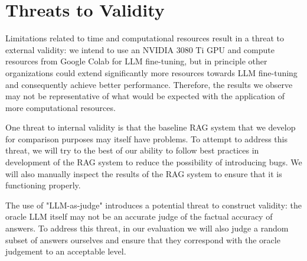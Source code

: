 \section{Threats to Validity}

Limitations related to time and computational resources result in a threat to
external validity: we intend to use an NVIDIA 3080 Ti GPU and compute resources
from Google Colab for LLM fine-tuning, but in principle other organizations
could extend significantly more resources towards LLM fine-tuning and
consequently achieve better performance. Therefore, the results we observe may
not be representative of what would be expected with the application of more
computational resources.

One threat to internal validity is that the baseline
RAG system that we develop for comparison purposes may itself have problems. To
attempt to address this threat, we will try to the best of our ability to follow
best practices in development of the RAG system to reduce the possibility of
introducing bugs. We will also manually inspect the results of the RAG system to
ensure that it is functioning properly.

The use of "LLM-as-judge" introduces a potential threat to construct validity:
the oracle LLM itself may not be an accurate judge of the factual accuracy of
answers. To address this threat, in our evaluation we will also judge a random
subset of answers ourselves and ensure that they correspond with the oracle
judgement to an acceptable level.
